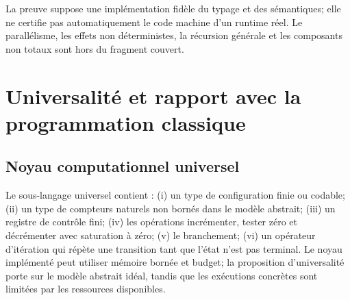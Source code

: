 \documentclass[11pt,a4paper,openany]{book}
\theoremstyle{definition}
\theoremstyle{plain}
\theoremstyle{remark}
\begin{document}
La preuve suppose une implémentation fidèle du typage et des sémantiques; elle ne certifie pas automatiquement le code machine d'un runtime réel. Le parallélisme, les effets non déterministes, la récursion générale et les composants non totaux sont hors du fragment couvert.

\chapter[Universalité et rapport classique]{Universalité et rapport avec la programmation classique}
\section{Noyau computationnel universel}
Le sous-langage universel contient : (i) un type de configuration finie ou codable; (ii) un type de compteurs naturels non bornés dans le modèle abstrait; (iii) un registre de contrôle fini; (iv) les opérations incrémenter, tester zéro et décrémenter avec saturation à zéro; (v) le branchement; (vi) un opérateur d'itération qui répète une transition tant que l'état n'est pas terminal. Le noyau implémenté peut utiliser mémoire bornée et budget; la proposition d'universalité porte sur le modèle abstrait idéal, tandis que les exécutions concrètes sont limitées par les ressources disponibles.
\end{document}
